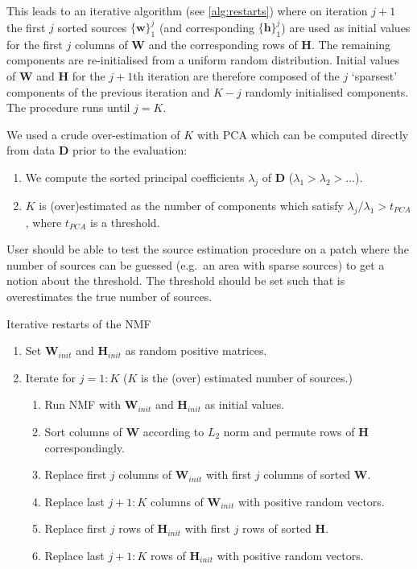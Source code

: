 This leads to an iterative algorithm (see \autoref{alg:restarts}) where on iteration $j+1$ the first $j$ sorted sources $\{ \bm{w} \}_{1}^{j}$ (and corresponding $\{ \bm{h} \}_{1}^{j}$) are used as initial values for the first $j$ columns of $\bm{W}$ and the corresponding rows of $\bm{H}$. The remaining components are re-initialised from a uniform random distribution. Initial values of $\bm{W}$ and $\bm{H}$ for the $j+1$th iteration are therefore composed of the $j$ `sparsest' components of the previous iteration and $K-j$ randomly initialised components. The procedure runs until $j=K$. 

We used a crude over-estimation of $K$ with PCA which can be computed directly from data $\bm{D}$ prior to the evaluation: 
%
\begin{enumerate}
	\item
	We compute the sorted principal coefficients $\lambda_{j}$ of $\bm{D}$ ($\lambda_{1}>\lambda_{2}>...$). 
	\item
	$K$ is (over)estimated as the number of components which satisfy $\lambda_{j}/\lambda_{1}>t_{\unit{PCA}}$, where $t_{\unit{PCA}}$ is a threshold. 
\end{enumerate}
%
User should be able to test the source estimation procedure on a patch where the number of sources can be guessed (e.g.\ an area with sparse sources) to get a notion about the threshold. The threshold should be set such that is overestimates the true number of sources.

\begin{algorithm}
	\caption{Iterative restarts of the NMF}	
	\label{alg:restarts}
	\begin{enumerate}
		\item Set $\bm{W}_{init}$ and $\bm{H}_{init}$ as random positive matrices.
		\item Iterate for $j=1:K$ ($K$ is the (over) estimated number of sources.)
		\begin{enumerate}
			\item Run NMF with $\bm{W}_{init}$ and $\bm{H}_{init}$ as initial values.
			\item Sort columns of $\bm{W}$ according to $L_2$ norm and permute rows of $\bm{H}$ correspondingly.
			\item Replace first $j$ columns of $\bm{W}_{init}$ with first $j$ columns of sorted $\bm{W}$.
			\item Replace last $j+1:K$ columns of $\bm{W}_{init}$ with positive random vectors.
			\item Replace first $j$ rows of $\bm{H}_{init}$ with first $j$ rows of sorted $\bm{H}$.
			\item Replace last $j+1:K$ rows of $\bm{H}_{init}$ with positive random vectors.
		\end{enumerate}
	\end{enumerate}    
\end{algorithm}

